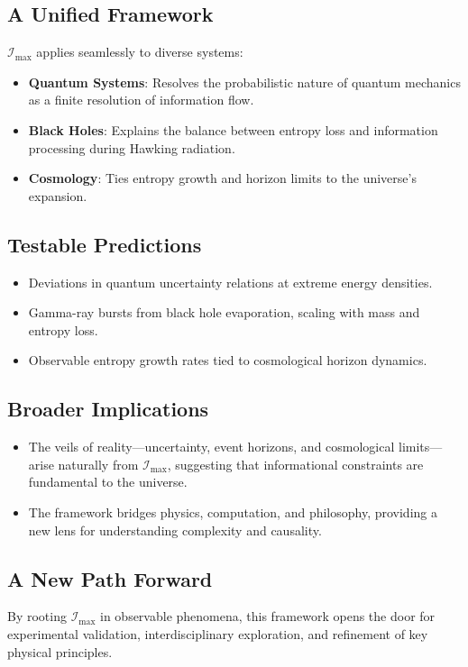 \documentclass[12pt]{article}
\begin{document}
\subsection{A Unified Framework}
\( \mathcal{I}_{\text{max}} \) applies seamlessly to diverse systems:
\begin{itemize}
    \item \textbf{Quantum Systems}: Resolves the probabilistic nature of quantum mechanics as a finite resolution of information flow.
    \item \textbf{Black Holes}: Explains the balance between entropy loss and information processing during Hawking radiation.
    \item \textbf{Cosmology}: Ties entropy growth and horizon limits to the universe’s expansion.
\end{itemize}

\subsection{Testable Predictions}
\begin{itemize}
    \item Deviations in quantum uncertainty relations at extreme energy densities.
    \item Gamma-ray bursts from black hole evaporation, scaling with mass and entropy loss.
    \item Observable entropy growth rates tied to cosmological horizon dynamics.
\end{itemize}

\subsection{Broader Implications}
\begin{itemize}
    \item The veils of reality—uncertainty, event horizons, and cosmological limits—arise naturally from \( \mathcal{I}_{\text{max}} \), suggesting that informational constraints are fundamental to the universe.
    \item The framework bridges physics, computation, and philosophy, providing a new lens for understanding complexity and causality.
\end{itemize}

\subsection{A New Path Forward}
By rooting \( \mathcal{I}_{\text{max}} \) in observable phenomena, this framework opens the door for experimental validation, interdisciplinary exploration, and refinement of key physical principles.
\end{document}
